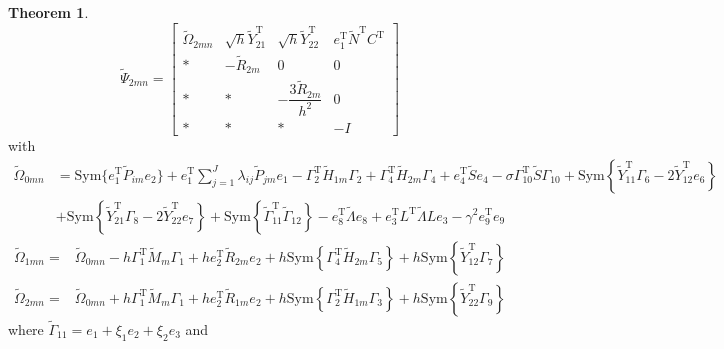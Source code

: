 \documentclass[preprint,review,fleqn,sort&compress,3p]{elsarticle}
\theoremstyle{definition} %
\theoremstyle{definition}%
\newtheorem{thm}{Theorem}[section]
\begin{document}
\begin{thm}
\begin{equation}\label{LMI2_not}
\widetilde{\Psi}_{2mn} =
\begin{bmatrix}
	\widetilde{\Omega}_{2mn} & \sqrt{h} \widetilde{Y}_{21}^{\mathrm{T}} & \sqrt{h} \widetilde{Y}_{22}^{\mathrm{T}} & e_1^{\mathrm{T}} \widetilde{N}^{\mathrm{T}}C^{\mathrm{T}} \\[1.5ex]
	* & -\widetilde{R}_{2m} & 0 & 0 \\[1.5ex]
	* & * & -\dfrac{3\widetilde{R}_{2m}}{h^2} & 0  \\[1.5ex]
	* & * & * & -I 
\end{bmatrix}
\end{equation}
	with
\begin{align*}
	\widetilde{\Omega}_{0mn} &=  \mathrm{Sym} \{e_1^{\mathrm{T}} \widetilde{P}_{im} e_2\}
	+e_1^{\mathrm{T}}  \sum_{j=1}^J {\lambda}_{ij}\widetilde{P}_{jm} e_1
	-\Gamma_{2}^{\mathrm{T}} \widetilde{H}_{1m} \Gamma_{2}
	+\Gamma_{4}^{\mathrm{T}} \widetilde{H}_{2m} \Gamma_{4}
	+e_{4}^{\mathrm{T}} \widetilde{S} e_{4}
	-\sigma \Gamma_{10}^{\mathrm{T}} \widetilde{S} \Gamma_{10}
	+ \mathrm{Sym} \left\{ \widetilde{Y}_{11}^{\mathrm{T}}\Gamma_{6}  -2\widetilde{Y}_{12}^{\mathrm{T}}e_6
	\right\} \\
	&+\mathrm{Sym} \left\{ \widetilde{Y}_{21}^{\mathrm{T}}\Gamma_{8} - 2\widetilde{Y}_{22}^{\mathrm{T}}e_7  \right\}
	+\mathrm{Sym} \left\{ 
	\widetilde{\Gamma}_{11}^{\mathrm{T}} \widetilde{\Gamma}_{12}
	\right\}
	-e_{8}^{\mathrm{T}}  \widetilde{\Lambda} e_{8} 
	+e_{3}^{\mathrm{T}} L^{\mathrm{T}}  \widetilde{\Lambda}  L e_{3} 
	-\gamma^2 e_{9}^{\mathrm{T}}e_{9}
\end{align*}
\begin{align*}
	\widetilde{\Omega}_{1mn} = &  \widetilde{\Omega}_{0mn}
	-h \Gamma_{1}^{\mathrm{T}}\widetilde{M}_{m}
	\Gamma_{1}
	+ h e_{2}^{\mathrm{T}} \widetilde{R}_{2m} e_{2}
	+h \mathrm{Sym} \left\{
	\Gamma_{4}^{\mathrm{T}} \widetilde{H}_{2m} \Gamma_{5}
	\right\}
	+h \mathrm{Sym} \left\{ 
	\widetilde{Y}_{12}^{\mathrm{T}}\Gamma_{7}
	\right\}
\end{align*}
\begin{align*}
	\widetilde{\Omega}_{2mn} = &\widetilde{\Omega}_{0mn} 
	+h \Gamma_{1}^{\mathrm{T}}\widetilde{M}_{m}
	\Gamma_{1}
	+he_{2}^{\mathrm{T}} \widetilde{R}_{1m} e_{2}
	+h \mathrm{Sym} \left\{
	\Gamma_{2}^{\mathrm{T}} \widetilde{H}_{1m} \Gamma_{3}
	\right\}
	+h \mathrm{Sym} \left\{ 
	\widetilde{Y}_{22}^{\mathrm{T}}\Gamma_{9}
	\right\}
\end{align*}
where $\widetilde{\Gamma}_{11}=e_1+\xi_1e_2+\xi_2e_3$ and

\end{thm}
\end{document}
